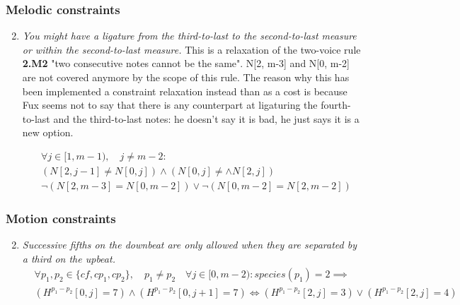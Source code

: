 \subsubsection{Melodic constraints}
\begin{enumerate}[wide, label=\bfseries 2.M\arabic*]
\setcounter{enumi}{1} %
    \item \textit{You might have a ligature from the third-to-last to the second-to-last measure or within the second-to-last measure.} \label{constraint:2nd-species-ligatures}    
    This is a relaxation of the two-voice rule \textbf{2.M2} "two consecutive notes cannot be the same". N[2, m-3] and N[0, m-2] are not covered anymore by the scope of this rule. The reason why this has been implemented a constraint relaxation instead than as a cost is because Fux seems not to say that there is any counterpart at ligaturing the fourth-to-last and the third-to-last notes: he doesn't say it is bad, he just says it is a new option.

    \begin{equation}
        \begin{aligned}
            &\forall j \in [1, m-1), \quad j \neq m-2:\\
            &(N[2, j-1] \neq N[0, j]) \land (N[0, j] \neq \land N[2, j])\\
            &\neg (N[2, m-3] = N[0, m-2]) \lor \neg(N[0, m-2] = N[2, m-2])
        \end{aligned}
    \end{equation}
\end{enumerate}

\subsubsection{Motion constraints}
\begin{enumerate}[wide, label=\bfseries 2.P\arabic*]
\setcounter{enumi}{1} %
    \item \textit{Successive fifths on the downbeat are only allowed when they are separated by a third on the upbeat.} \label{constraint:succ-fifths-flanking-third}    
    \begin{equation} \begin{aligned}
    &\forall p_1, p_2 \in \{cf, cp_1, cp_2\}, \quad p_1 \neq p_2 \quad \forall j \in [0, m-2): species(p_1)=2 \implies \\
    &(H^{p_1-p_2}[0, j] = 7) \land (H^{p_1-p_2}[0, j+1] = 7) \iff (H^{p_1-p_2}[2, j] = 3) \lor (H^{p_1-p_2}[2, j] = 4)
    \end{aligned} \end{equation}
\end{enumerate}


